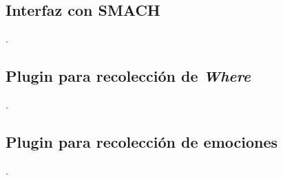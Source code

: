 \subsection{Interfaz con SMACH}

.



\subsection{Plugin para recolección de \textit{Where}}
.

\subsection{Plugin para recolección de emociones}
.


